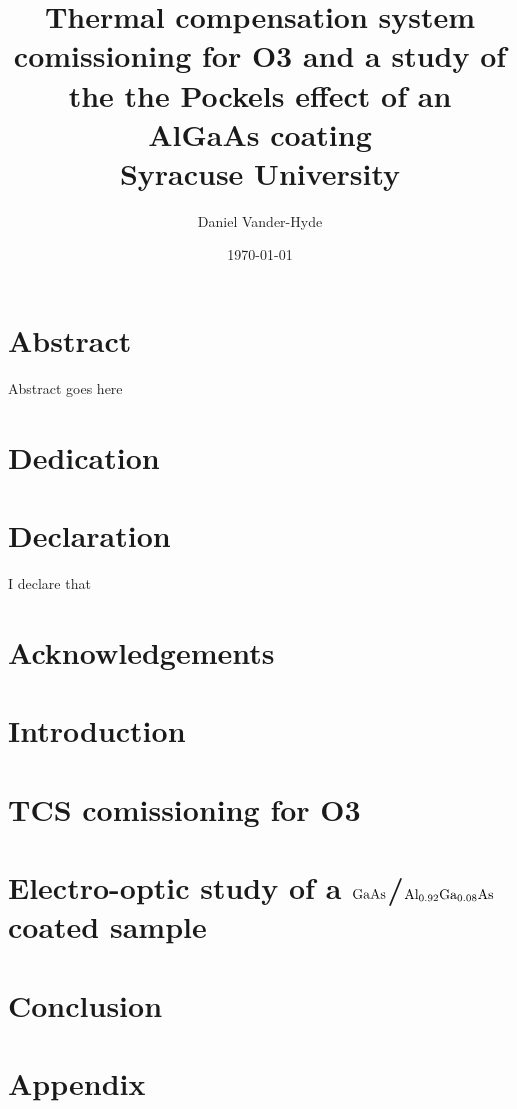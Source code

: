 \documentclass[12pt]{report}
\title{
{Thermal compensation system comissioning for O3 and a study of the
the Pockels effect of an AlGaAs coating}\\
{\large Syracuse University}\\
}
\author{Daniel Vander-Hyde}
\date{\today}
\newcommand{\algaas}{\mathrm{Al_{0.92}Ga_{0.08}As}}
\newcommand{\gaas}{\mathrm{GaAs}}
\begin{document}
\maketitle

\chapter*{Abstract}
Abstract goes here

\chapter*{Dedication}

\chapter*{Declaration}
I declare that

\chapter*{Acknowledgements}


\tableofcontents

\maketitle

\newpage


\chapter{Introduction}

\newpage

\chapter{TCS comissioning for O3}


\chapter{Electro-optic study of a $\protect\gaas$/$\protect\algaas$ coated sample}


\chapter{Conclusion}

\chapter{Appendix}




\end{document}
